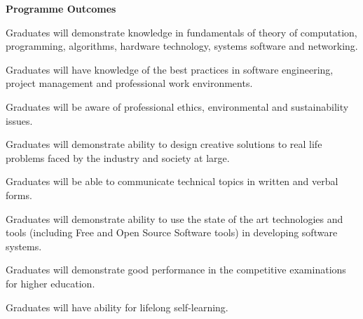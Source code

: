 \documentclass[a4paper]{article}
\begin{document}
\LARGE\textbf{Programme Outcomes}
\\
\begin{enumerate}
\Large{
\item Graduates will demonstrate knowledge in fundamentals of theory of computation, programming, algorithms, hardware technology, systems software and networking.

\item Graduates will have knowledge of the best practices in software engineering, project management and professional work environments.

\item Graduates will be aware of professional ethics, environmental and sustainability issues.

\item Graduates will demonstrate ability to design creative solutions to real life problems faced by the industry and society at large.

\item Graduates will be able to communicate technical topics in written and verbal forms.

\item Graduates will demonstrate ability to use the state of the art technologies and tools (including Free and Open Source Software tools) in developing software systems.

\item Graduates will demonstrate good performance in the competitive examinations for higher education.

\item Graduates will have ability for lifelong self-learning.
}
\end{enumerate}
\end{document}
